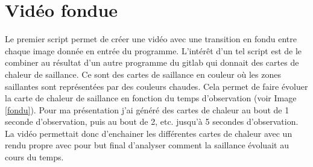 \section{Vidéo fondue}

Le premier script permet de créer une vidéo avec une transition en fondu entre chaque image donnée en entrée du programme. L'intérêt d'un tel script est de le combiner au résultat d'un autre programme du gitlab qui donnait des cartes de chaleur de saillance. Ce sont des cartes de saillance en couleur où les zones saillantes sont représentées par des couleurs chaudes. Cela permet de faire évoluer la carte de chaleur de saillance en fonction du temps d'observation (voir Image \ref{fondu}). Pour ma présentation j'ai généré des cartes de chaleur au bout de 1 seconde d'observation, puis au bout de 2, etc. jusqu'à 5 secondes d'observation. La vidéo permettait donc d'enchainer les différentes cartes de chaleur avec un rendu propre avec pour but final d'analyser comment la saillance évoluait au cours du temps.

